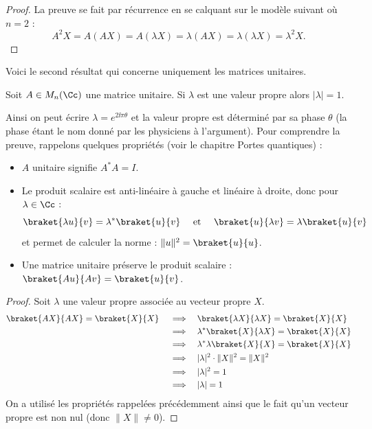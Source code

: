 \documentclass[11pt,class=report,crop=false]{standalone}
\begin{document}
\begin{proof}
La preuve se fait par récurrence en se calquant sur le modèle suivant où $n=2$ :
$$A^2 X = A (AX) = A(\lambda X) = \lambda (AX) = \lambda (\lambda X) = \lambda^2 X.$$
\end{proof}

Voici le second résultat qui concerne uniquement les matrices unitaires.
\begin{lemme}
\label{lem:vp2}
Soit $A \in M_n(\Cc)$ une matrice unitaire.
Si $\lambda$ est une valeur propre alors $|\lambda|=1$.
\end{lemme}
Ainsi on peut écrire $\lambda = e^{2\ii\pi \theta}$ et la valeur propre est déterminé par sa \og{}phase\fg{} $\theta$ (la phase étant le nom donné par les physiciens à l'argument).
Pour comprendre la preuve, rappelons quelques propriétés (voir le chapitre \og{}Portes quantiques\fg{}) :
\begin{itemize}
  \item $A$ unitaire signifie $A^* A = I$.
  \item Le produit scalaire est anti-linéaire à gauche et linéaire à droite, donc pour $\lambda\in\Cc$ :
$$\displaystyle
\braket{ \lambda u}{v} = \lambda^* \braket{u}{v}
\quad \text{ et } \quad \braket{u}{\lambda v} = \lambda \braket{u}{v}
$$
et permet de calculer la norme : $\|u\|^2 = \braket{u}{u}$.

  \item Une matrice unitaire préserve le produit scalaire :  
$\braket{Au}{Av} = \braket{u}{v}$.
\end{itemize}

\begin{proof}
Soit $\lambda$ une valeur propre associée au vecteur propre $X$.
\begin{align*}
 \braket{AX}{AX} = \braket{X}{X} 
\quad \implies  & \quad \braket{\lambda X}{\lambda X} = \braket{X}{X} \\
\quad \implies  & \quad \lambda^* \braket{X}{\lambda X} = \braket{X}{X} \\
\quad \implies  & \quad \lambda^* \lambda \braket{X}{X} = \braket{X}{X} \\
\quad \implies  & \quad |\lambda|^2 \cdot  \| X \|^2  =  \| X \|^2 \\
\quad \implies  & \quad |\lambda|^2  =  1\\
\quad \implies  & \quad |\lambda|  =  1\\
\end{align*}
On a utilisé les propriétés rappelées précédemment ainsi que le fait qu'un vecteur propre est non nul (donc $\|X\| \neq 0$).
\end{proof}
\end{document}
